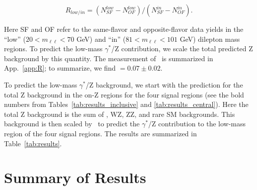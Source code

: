 \begin{equation}
R_{low/in} = (N_{SF}^{low}-N_{OF}^{low})/(N_{SF}^{in}-N_{OF}^{in}).
\end{equation}

Here SF and OF refer to the same-flavor and opposite-flavor data yields in the ``low'' ($20<m_{\ell\ell}<70$ GeV) and ``in'' 
($81<m_{\ell\ell}<101$ GeV) dilepton mass regions. To predict the low-mass $\gamma^*$/Z contribution, we scale the total predicted
Z background by this quantity. The measurement of \rlowin\ is summarized in App.~\ref{app:R}; to summarize, we find \rlowin$=0.07\pm0.02$.

To predict the low-mass $\gamma^*$/Z background, we start with the prediction for the total Z background in the on-Z regions for the four signal
regions (see the bold numbers from Tables~\ref{tab:results_inclusive} and \ref{tab:results_central}). Here the total Z background is the sum of \zjets,
WZ, ZZ, and rare SM backgrounds. This background is then scaled by \rlowin\ to predict the $\gamma^*$/Z contribution to the low-mass region of the
four signal regions. The results are summarized in Table~\ref{tab:results}.



\section{Summary of Results}
\label{sec:templates_summary}

